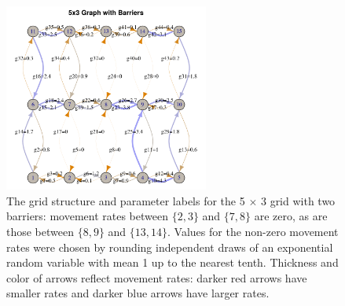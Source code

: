 \documentclass{article}
\begin{document}
\begin{figure}
\centering
     \includegraphics[width=0.6\textwidth]{figs/5x3b_grid}
    \caption{The grid structure and parameter labels
    for the 5 $\times$ 3 grid with two barriers:
    movement rates between $\{2,3\}$ and $\{7,8\}$ are zero,
    as are those between $\{8,9\}$ and $\{13,14\}$.
    Values for the non-zero movement rates 
    were chosen by rounding independent draws of an exponential random variable with mean 1 
    up to the nearest tenth.
    Thickness and color of arrows reflect movement rates:
    darker red arrows have smaller rates and darker blue arrows have larger rates.
    } \label{fig:5x3b_grid}
\end{figure}
\end{document}
